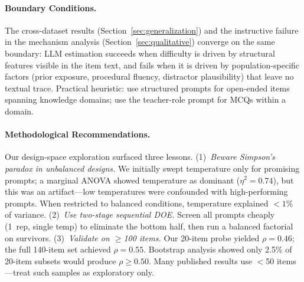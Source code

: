 \documentclass[runningheads]{llncs}
\begin{document}
\paragraph{Boundary Conditions.}
The cross-dataset results (Section~\ref{sec:generalization}) and the instructive failure in the mechanism analysis (Section~\ref{sec:qualitative}) converge on the same boundary: LLM estimation succeeds when difficulty is driven by structural features visible in the item text, and fails when it is driven by population-specific factors (prior exposure, procedural fluency, distractor plausibility) that leave no textual trace. Practical heuristic: use structured prompts for open-ended items spanning knowledge domains; use the teacher-role prompt for MCQs within a domain.

\paragraph{Methodological Recommendations.}
Our design-space exploration surfaced three lessons. (1)~\emph{Beware Simpson's paradox in unbalanced designs.} We initially swept temperature only for promising prompts; a marginal ANOVA showed temperature as dominant ($\eta^2 = 0.74$), but this was an artifact---low temperatures were confounded with high-performing prompts. When restricted to balanced conditions, temperature explained $<1\%$ of variance. (2)~\emph{Use two-stage sequential DOE.} Screen all prompts cheaply (1~rep, single temp) to eliminate the bottom half, then run a balanced factorial on survivors. (3)~\emph{Validate on $\ge$100 items.} Our 20-item probe yielded $\rho = 0.46$; the full 140-item set achieved $\rho = 0.55$. Bootstrap analysis showed only 2.5\% of 20-item subsets would produce $\rho \ge 0.50$. Many published results use $<$50 items---treat such samples as exploratory only.
\end{document}
